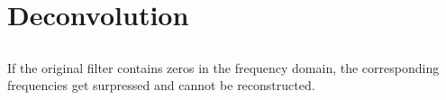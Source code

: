 \documentclass[DIN, pagenumber=false, fontsize=11pt, parskip=half]{scrartcl}
\begin{document}
    \section{Deconvolution}
    \subsection{}
    
    \subsection{}
    If the original filter contains zeros in the frequency domain, the corresponding frequencies get surpressed and cannot be reconstructed.
\end{document}
